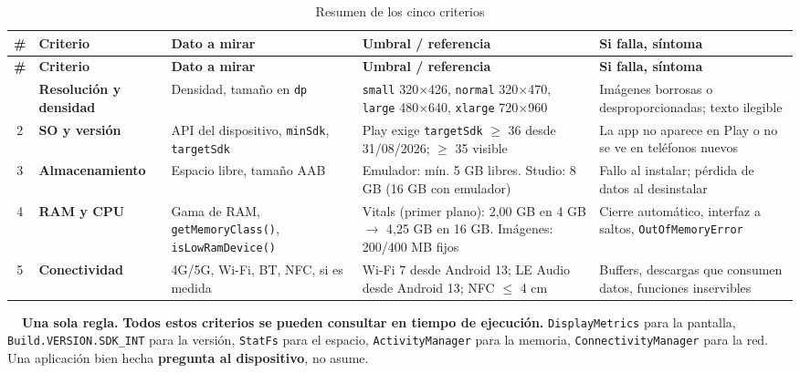 \documentclass[11pt,a4paper]{article}
\newcommand{\code}[1]{\texttt{\color{navylight}#1}}
\begin{document}
	{\footnotesize
		\begin{xltabular}{\textwidth}{@{}c >{\RaggedRight\arraybackslash}p{2.2cm} >{\RaggedRight\arraybackslash}p{3.3cm} >{\RaggedRight\arraybackslash}p{3.5cm} >{\RaggedRight\arraybackslash}X@{}}
			\caption{Resumen de los cinco criterios}\label{tab:resumen}\\
			\toprule
			\textcolor{paper}{\sffamily\bfseries \#} & \textcolor{paper}{\sffamily\bfseries Criterio} & \textcolor{paper}{\sffamily\bfseries Dato a mirar} & \textcolor{paper}{\sffamily\bfseries Umbral / referencia} & \textcolor{paper}{\sffamily\bfseries Si falla, síntoma} \\
			\midrule
			\endfirsthead
			\toprule
			\textcolor{paper}{\sffamily\bfseries \#} & \textcolor{paper}{\sffamily\bfseries Criterio} & \textcolor{paper}{\sffamily\bfseries Dato a mirar} & \textcolor{paper}{\sffamily\bfseries Umbral / referencia} & \textcolor{paper}{\sffamily\bfseries Si falla, síntoma} \\
			\midrule
			\endhead
			\bottomrule
			 & \textbf{Resolución y densidad} & Densidad, tamaño en \code{dp} & \code{small} 320$\times$426, \code{normal} 320$\times$470, \code{large} 480$\times$640, \code{xlarge} 720$\times$960 & Imágenes borrosas o desproporcionadas; texto ilegible \\
			2 & \textbf{SO y versión} & API del dispositivo, \code{minSdk}, \code{targetSdk} & Play exige \code{targetSdk} $\geq$ 36 desde 31/08/2026; $\geq$ 35 visible & La app no aparece en Play o no se ve en teléfonos nuevos \\
			3 & \textbf{Almacenamiento} & Espacio libre, tamaño AAB & Emulador: mín. 5 GB libres. Studio: 8 GB (16 GB con emulador) & Fallo al instalar; pérdida de datos al desinstalar \\
			4 & \textbf{RAM y CPU} & Gama de RAM, \code{getMemoryClass()}, \code{isLowRamDevice()} & Vitals (primer plano): 2,00 GB en 4 GB $\to$ 4,25 GB en 16 GB. Imágenes: 200/400 MB fijos & Cierre automático, interfaz a saltos, \code{OutOfMemoryError} \\
			5 & \textbf{Conectividad} & 4G/5G, Wi-Fi, BT, NFC, si es medida & Wi-Fi 7 desde Android 13; LE Audio desde Android 13; NFC $\leq$ 4 cm & Buffers, descargas que consumen datos, funciones inservibles \\
		\end{xltabular}
	}
	
	\begin{ideabox}
		\textbf{\color{teal}\faLightbulb\ \ Una sola regla.}
		\textbf{Todos estos criterios se pueden consultar en tiempo de ejecución.} \code{DisplayMetrics} para la pantalla, \code{Build.VERSION.SDK\_INT} para la versión, \code{StatFs} para el espacio, \code{ActivityManager} para la memoria, \code{ConnectivityManager} para la red. Una aplicación bien hecha \textbf{pregunta al dispositivo}, no asume.
	\end{ideabox}
	
\end{document}
